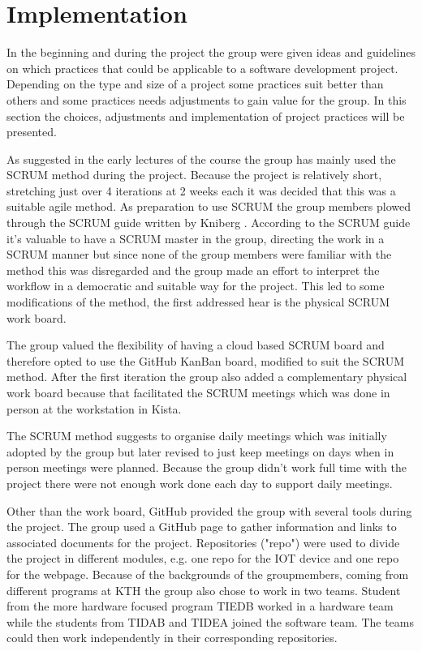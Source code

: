 
\section{Implementation}
In the beginning and during the project the group were given ideas and guidelines on which practices that could be applicable to a software development project. Depending on the type and size of a project some practices suit better than others and some practices needs adjustments to gain value for the group. In this section the choices, adjustments and implementation of project practices will be presented.

As suggested in the early lectures of the course the group has mainly used the SCRUM method during the project. Because the project is relatively short, stretching just over 4 iterations at 2 weeks each it was decided that this was a suitable agile method. As preparation to use SCRUM the group members plowed through the SCRUM guide written by Kniberg \cite{kniberg_scrum_2015}. According to the SCRUM guide it's valuable to have a SCRUM master in the group, directing the work in a SCRUM manner but since none of the group members were familiar with the method this was disregarded and the group made an effort to interpret the workflow in a democratic and suitable way for the project. This led to some modifications of the method, the first addressed hear is the physical SCRUM work board. 

The group valued the flexibility of having a cloud based SCRUM board and therefore opted to use the GitHub KanBan board, modified to suit the SCRUM method. After the first iteration the group also added a complementary physical work board  because that facilitated the SCRUM meetings which was done in person at the workstation in Kista. 

The SCRUM method suggests to organise daily meetings which was initially adopted by the group but later revised to just keep meetings on days when in person meetings were planned. Because the group didn't work full time with the project there were not enough work done each day to support daily meetings. 

Other than the work board, GitHub provided the group with several tools during the project. The group used a GitHub page to gather information and links to associated documents for the project. Repositories ("repo") were used to divide the project in different modules, e.g. one repo for the IOT device and one repo for the webpage. Because of the backgrounds of the groupmembers, coming from different programs at KTH the group also chose to work in two teams. Student from the more hardware focused program TIEDB worked in a hardware team while the students from TIDAB and TIDEA joined the software team. The teams could then work independently in their corresponding repositories. 

